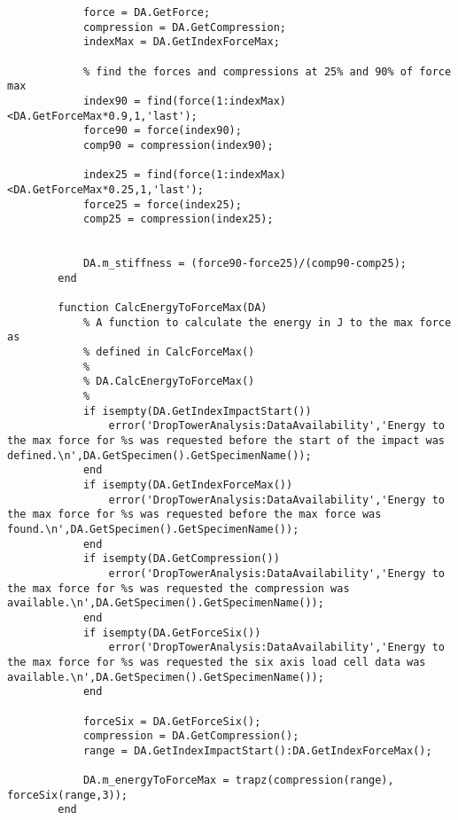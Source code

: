 \begin{lstlisting}
            force = DA.GetForce;
            compression = DA.GetCompression;
            indexMax = DA.GetIndexForceMax;
            
            % find the forces and compressions at 25% and 90% of force max
            index90 = find(force(1:indexMax)<DA.GetForceMax*0.9,1,'last');        
            force90 = force(index90);
            comp90 = compression(index90);
            
            index25 = find(force(1:indexMax)<DA.GetForceMax*0.25,1,'last');
            force25 = force(index25);
            comp25 = compression(index25);
            
            
            DA.m_stiffness = (force90-force25)/(comp90-comp25);
        end
        
        function CalcEnergyToForceMax(DA)
            % A function to calculate the energy in J to the max force as 
            % defined in CalcForceMax()
            %
            % DA.CalcEnergyToForceMax()
            %
            if isempty(DA.GetIndexImpactStart())
                error('DropTowerAnalysis:DataAvailability','Energy to the max force for %s was requested before the start of the impact was defined.\n',DA.GetSpecimen().GetSpecimenName());
            end
            if isempty(DA.GetIndexForceMax())
                error('DropTowerAnalysis:DataAvailability','Energy to the max force for %s was requested before the max force was found.\n',DA.GetSpecimen().GetSpecimenName());
            end
            if isempty(DA.GetCompression())
                error('DropTowerAnalysis:DataAvailability','Energy to the max force for %s was requested the compression was available.\n',DA.GetSpecimen().GetSpecimenName());
            end
            if isempty(DA.GetForceSix())
                error('DropTowerAnalysis:DataAvailability','Energy to the max force for %s was requested the six axis load cell data was available.\n',DA.GetSpecimen().GetSpecimenName());
            end
            
            forceSix = DA.GetForceSix();
            compression = DA.GetCompression();
            range = DA.GetIndexImpactStart():DA.GetIndexForceMax();
            
            DA.m_energyToForceMax = trapz(compression(range), forceSix(range,3));
        end
        

\end{lstlisting}
